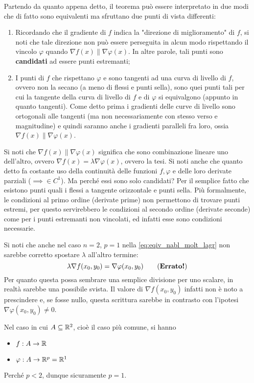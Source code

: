 \begin{observation}
	Partendo da quanto appena detto, il teorema può essere interpretato in due modi che di fatto sono equivalenti ma sfruttano due punti di vista differenti:
	\begin{enumerate}
		\item Ricordando che il gradiente di $f$ indica la "direzione di miglioramento" di $f$, si noti che tale direzione non può essere perseguita in alcun modo rispettando il vincolo $\varphi$ quando $\nabla f(x) \parallel \nabla \varphi(x)$. In altre parole, tali punti sono \textbf{candidati} ad essere punti estremanti;
		\item I punti di $f$ che rispettano $\varphi$ e sono tangenti ad una curva di livello di $f$, ovvero non la secano (a meno di flessi e punti sella), sono quei punti tali per cui la tangente della curva di livello di $f$ e di $\varphi$ si equivalgono (appunto in quanto tangenti). Come detto prima i gradienti delle curve di livello sono ortogonali alle tangenti (ma non necessariamente con stesso verso e magnitudine) e quindi saranno anche i gradienti paralleli fra loro, ossia $\nabla f(x) \parallel \nabla \varphi(x)$.
	\end{enumerate}
	Si noti che $\nabla f(x) \parallel \nabla \varphi(x)$ significa che sono combinazione lineare uno dell'altro, ovvero $\nabla f(x) = \lambda \nabla \varphi(x)$, ovvero la tesi.
	Si noti anche che quanto detto fa costante uso della continuità delle funzioni $f, \varphi$ e delle loro derivate parziali ($\implies \in C^1$).
	Ma perché essi sono solo candidati? Per il semplice fatto che esistono punti quali i flessi a tangente orizzontale e punti sella. Più formalmente, le condizioni al primo ordine (derivate prime) non permettono di trovare punti estremi, per questo servirebbero le condizioni al secondo ordine (derivate seconde) come per i punti estremanti non vincolati, ed infatti esse sono condizioni necessarie.
\end{observation}
\begin{observation}
	Si noti che anche nel caso $n = 2$, $p = 1$ nella \cref{eq:eqiv_nabl_molt_lagr} non sarebbe corretto spostare $\lambda$ all'altro termine:
	\[\lambda \nabla f(x_0, y_0) = \nabla \varphi (x_0, y_0) \tag{\textbf{Errato!}}\]
	Per quanto questa possa sembrare una semplice divisione per uno scalare, in realtà sarebbe una possibile svista. Il valore di $\nabla f(x_0,y_0)$ infatti non è noto a prescindere e, se fosse nullo, questa scrittura sarebbe in contrasto con l'ipotesi $\nabla \varphi(x_0,y_0) \neq 0$.
\end{observation}
\begin{example}
	\label{ex:max_min_vinc_n2_p1}
	Nel caso in cui $A \subseteq \mathbb{R}^2$, cioè il caso più comune, si hanno
	\begin{itemize}[noitemsep]
		\item $f: A \to \mathbb{R}$
		\item $\varphi: A \to \mathbb{R}^p = \mathbb{R}^1$
	\end{itemize}
	Perché $p < 2$, dunque sicuramente $p = 1$.
\end{example}

